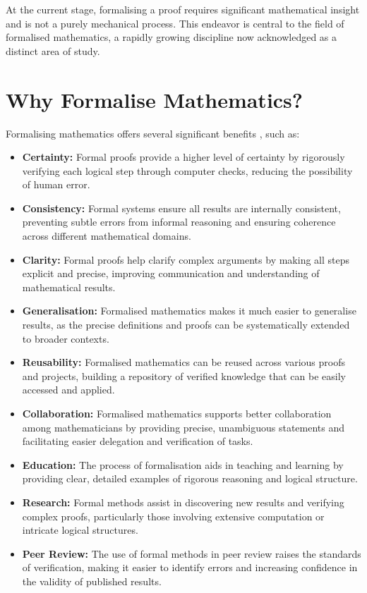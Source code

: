 At the current stage, formalising a proof requires significant mathematical insight and is not a purely mechanical process.
This endeavor is central to the field of formalised mathematics, a rapidly growing discipline now acknowledged
as a distinct area of study.

\section{Why Formalise Mathematics?}

Formalising mathematics offers several significant benefits \cite{Massot2021}, such as:

\begin{itemize}
    \item \textbf{Certainty:} Formal proofs provide a higher level of certainty by rigorously verifying each logical step through computer checks, reducing the possibility of human error.
    \item \textbf{Consistency:} Formal systems ensure all results are internally consistent, preventing subtle errors from informal reasoning and ensuring coherence across different mathematical domains.
    \item \textbf{Clarity:} Formal proofs help clarify complex arguments by making all steps explicit and precise, improving communication and understanding of mathematical results.
    \item \textbf{Generalisation:} Formalised mathematics makes it much easier to generalise results, as the precise definitions and proofs can be systematically extended to broader contexts.
    \item \textbf{Reusability:} Formalised mathematics can be reused across various proofs and projects, building a repository of verified knowledge that can be easily accessed and applied.
    \item \textbf{Collaboration:} Formalised mathematics supports better collaboration among mathematicians by providing precise, unambiguous statements and facilitating easier delegation and verification of tasks.
    \item \textbf{Education:} The process of formalisation aids in teaching and learning by providing clear, detailed examples of rigorous reasoning and logical structure.
    \item \textbf{Research:} Formal methods assist in discovering new results and verifying complex proofs, particularly those involving extensive computation or intricate logical structures.
    \item \textbf{Peer Review:} The use of formal methods in peer review raises the standards of verification, making it easier to identify errors and increasing confidence in the validity of published results.
\end{itemize}

